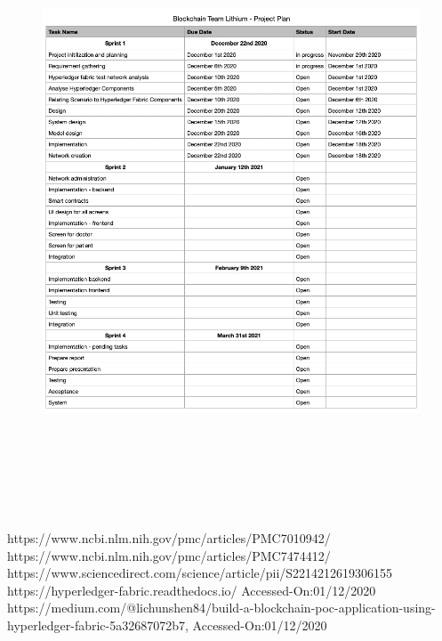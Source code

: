 \documentclass[journal,12pt,onecolumn]{IEEEtran}
\begin{document}
\begin{figure}[!htbp]
\centering
    \includegraphics[width=16cm, height=18cm]{ProjectPlan.png}
    \caption{}
    \label{fig:projectPlan}
\end{figure}


\begin{thebibliography}{1}
 https://www.ncbi.nlm.nih.gov/pmc/articles/PMC7010942/
 https://www.ncbi.nlm.nih.gov/pmc/articles/PMC7474412/
 https://www.sciencedirect.com/science/article/pii/S2214212619306155
 https://hyperledger-fabric.readthedocs.io/ Accessed-On:01/12/2020
 https://medium.com/@lichunshen84/build-a-blockchain-poc-application-using-hyperledger-fabric-5a32687072b7, Accessed-On:01/12/2020


\end{thebibliography}



\end{document}
